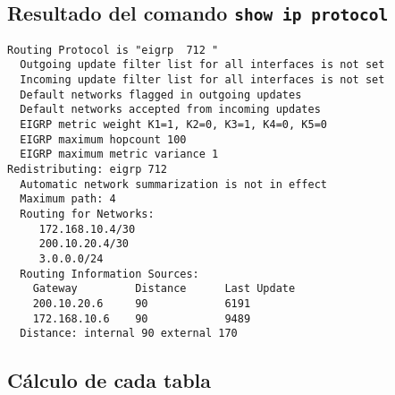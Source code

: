 \documentclass[12pt, times]{simauth}
\begin{document}
\subsection{Resultado del comando \texttt{show ip protocol}}
\begin{verbatim}
Routing Protocol is "eigrp  712 " 
  Outgoing update filter list for all interfaces is not set 
  Incoming update filter list for all interfaces is not set 
  Default networks flagged in outgoing updates  
  Default networks accepted from incoming updates 
  EIGRP metric weight K1=1, K2=0, K3=1, K4=0, K5=0
  EIGRP maximum hopcount 100
  EIGRP maximum metric variance 1
Redistributing: eigrp 712
  Automatic network summarization is not in effect  
  Maximum path: 4
  Routing for Networks:  
     172.168.10.4/30
     200.10.20.4/30
     3.0.0.0/24
  Routing Information Sources:  
    Gateway         Distance      Last Update 
    200.10.20.6     90            6191       
    172.168.10.6    90            9489       
  Distance: internal 90 external 170
\end{verbatim}

\subsection{Cálculo de cada tabla}
\end{document}
